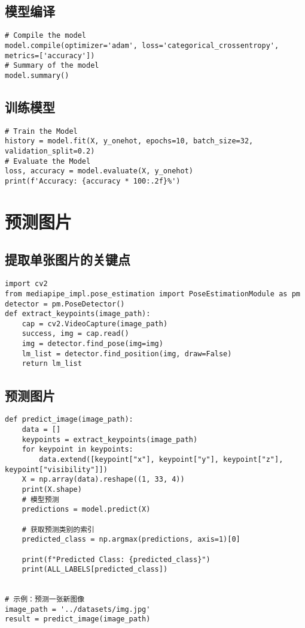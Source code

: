 \subsection{模型编译}

\begin{lstlisting}
# Compile the model
model.compile(optimizer='adam', loss='categorical_crossentropy', metrics=['accuracy'])
# Summary of the model
model.summary()
\end{lstlisting}

\subsection{训练模型}

\begin{lstlisting}
# Train the Model
history = model.fit(X, y_onehot, epochs=10, batch_size=32, validation_split=0.2)
# Evaluate the Model
loss, accuracy = model.evaluate(X, y_onehot)
print(f'Accuracy: {accuracy * 100:.2f}%')
\end{lstlisting}

\section{预测图片}

\subsection{提取单张图片的关键点}

\begin{lstlisting}
import cv2
from mediapipe_impl.pose_estimation import PoseEstimationModule as pm
detector = pm.PoseDetector()
def extract_keypoints(image_path):
    cap = cv2.VideoCapture(image_path)
    success, img = cap.read()
    img = detector.find_pose(img=img)
    lm_list = detector.find_position(img, draw=False)
    return lm_list
\end{lstlisting}

\subsection{预测图片}

\begin{lstlisting}
def predict_image(image_path):
    data = []
    keypoints = extract_keypoints(image_path)
    for keypoint in keypoints:
        data.extend([keypoint["x"], keypoint["y"], keypoint["z"], keypoint["visibility"]])
    X = np.array(data).reshape((1, 33, 4))
    print(X.shape)
    # 模型预测
    predictions = model.predict(X)

    # 获取预测类别的索引
    predicted_class = np.argmax(predictions, axis=1)[0]

    print(f"Predicted Class: {predicted_class}")
    print(ALL_LABELS[predicted_class])


# 示例：预测一张新图像
image_path = '../datasets/img.jpg'
result = predict_image(image_path)
\end{lstlisting}